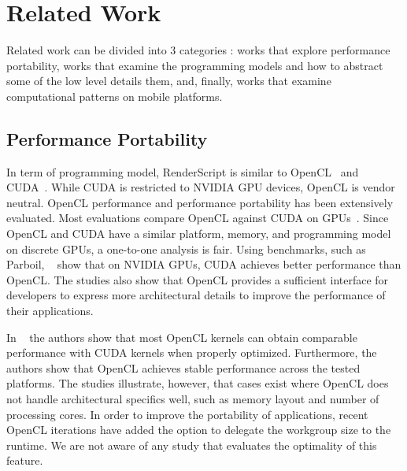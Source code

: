 \section{Related Work}
\label{sec:related}

Related work can be divided into $3$ categories : works that
explore performance portability, works that examine the
programming models and how to abstract some of the low level details them, and,
finally, works that examine computational patterns on mobile platforms.

\subsection{Performance Portability}

In term of programming model, RenderScript is similar to OpenCL~\cite{OpenCL_kh}
and CUDA~\cite{CUDA:Programming-Guide}. While CUDA is restricted to NVIDIA GPU
devices, OpenCL is vendor neutral. OpenCL performance and performance
portability has been extensively evaluated.  Most evaluations compare OpenCL
against CUDA on GPUs~\cite{fang2011comprehensive, weber2011comparing,
van2011correlating, vassilev2010comparison, amorim2009comparing,
karimi2010performance, komatsu2010evaluating}.  Since OpenCL and CUDA have a
similar platform, memory, and programming model on discrete GPUs, a one-to-one
analysis is fair.  Using benchmarks, such as Parboil, ~\cite{weber2011comparing,
van2011correlating, vassilev2010comparison, amorim2009comparing} show that on
NVIDIA GPUs, CUDA achieves better performance than OpenCL.  The studies also
show that OpenCL provides a sufficient interface for developers to express more
architectural details to improve the performance of their applications. 

In ~\cite{komatsu2010evaluating,fang2011comprehensive,dolbeau2013one} the
authors show that most OpenCL kernels can obtain comparable performance with
CUDA kernels when properly optimized.  Furthermore, the authors show that OpenCL
achieves stable performance across the tested platforms. The studies illustrate,
however, that cases exist where OpenCL does not handle architectural specifics
well, such as memory layout and number of processing cores. In order to improve
the portability of applications, recent OpenCL iterations have added the option
to delegate the workgroup size to the runtime.  We are not aware of any study
that evaluates the optimality of this feature.


